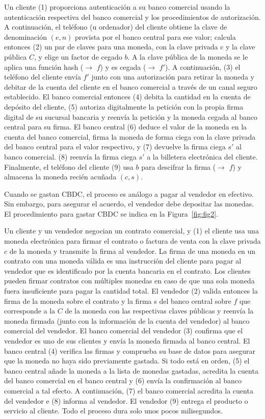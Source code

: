 \documentclass[a4paper,10pt]{article} %
\begin{document}
Un cliente (1) proporciona autenticación a su banco comercial usando la
autenticación respectiva del banco comercial y los procedimientos de
autorización. A continuación, el teléfono (u ordenador) del cliente
obtiene la clave de denominación $(e, n)$ provista por el banco central
para ese valor; calcula entonces (2) un par de claves para una moneda,
con la clave privada c y la clave pública $C$, y elige un factor de cegado
$b$. A la clave pública de la moneda se le aplica una función hash
($\to$ $f$) y es cegada ($\to$ $f'$). A continuación, (3) el teléfono
del cliente envía $f'$ junto con una autorización para retirar la
moneda y debitar de la cuenta del cliente en el banco comercial a través
de un canal seguro establecido. El banco comercial entonces (4) debita
la cantidad en la cuenta de depósito del cliente, (5) autoriza
digitalmente la petición con la propia firma digital de su sucursal
bancaria y reenvía la petición y la moneda cegada al banco central para
su firma. El banco central (6) deduce el valor de la moneda en la cuenta
del banco comercial, firma la moneda de forma ciega con la clave privada
del banco central para el valor respectivo, y (7) devuelve la firma
ciega $s'$ al banco comercial. (8) reenvía la firma ciega $s'$
a la billetera electrónica del cliente. Finalmente, el teléfono del
cliente (9) usa $b$ para descifrar la firma ($\to$ $f$) y almacena la
moneda recién acuñada $(c, s)$.

Cuando se gastan CBDC, el proceso es análogo a pagar al vendedor en
efectivo. Sin embargo, para asegurar el acuerdo, el vendedor debe
depositar las monedas. El procedimiento para gastar CBDC se indica en la
Figura~\ref{fig:fig2}.

Un cliente y un vendedor negocian un contrato comercial, y (1) el
cliente usa una moneda electrónica para firmar el contrato o factura de
venta con la clave privada $c$ de la moneda y transmite la firma al
vendedor. La firma de una moneda en un contrato con una moneda válida es
una instrucción del cliente para pagar al vendedor que es identificado
por la cuenta bancaria en el contrato. Los clientes pueden firmar
contratos con múltiples monedas en caso de que una sola moneda fuera
insuficiente para pagar la cantidad total. El vendedor (2) valida
entonces la firma de la moneda sobre el contrato y la firma s del banco
central sobre $f$ que corresponde a la $C$ de la moneda con las
respectivas claves públicas y reenvía la moneda firmada (junto con la
información de la cuenta del vendedor) al banco comercial del vendedor.
El banco comercial del vendedor (3) confirma que el vendedor es uno de
sus clientes y envía la moneda firmada al banco central. El banco
central (4) verifica las firmas y comprueba su base de datos para
asegurar que la moneda no haya sido previamente gastada. Si todo está en
orden, (5) el banco central añade la moneda a la lista de monedas
gastadas, acredita la cuenta del banco comercial en el banco central y
(6) envía la confirmación al banco comercial a tal efecto. A
continuación, (7) el banco comercial acredita la cuenta del vendedor e
(8) informa al vendedor. El vendedor (9) entrega el producto o servicio
al cliente. Todo el proceso dura solo unos pocos milisegundos.
\end{document}
